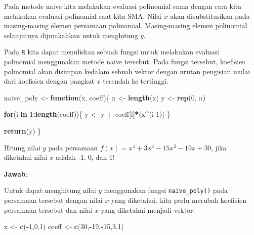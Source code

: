 \documentclass[]{book}
\newenvironment{Shaded}{\begin{snugshade}}{\end{snugshade}}
\newcommand{\ControlFlowTok}[1]{\textcolor[rgb]{0.13,0.29,0.53}{\textbf{#1}}}
\newcommand{\DecValTok}[1]{\textcolor[rgb]{0.00,0.00,0.81}{#1}}
\newcommand{\KeywordTok}[1]{\textcolor[rgb]{0.13,0.29,0.53}{\textbf{#1}}}
\newcommand{\NormalTok}[1]{#1}
\newcommand{\OperatorTok}[1]{\textcolor[rgb]{0.81,0.36,0.00}{\textbf{#1}}}
\newcommand{\StringTok}[1]{\textcolor[rgb]{0.31,0.60,0.02}{#1}}
\theoremstyle{definition}
\theoremstyle{definition}
\theoremstyle{definition}
\theoremstyle{remark}
\let\BeginKnitrBlock\begin \let\EndKnitrBlock\end
\begin{document}
Pada metode naive kita melakukan evaluasi polinomial sama dengan cara kita melakukan evaluasi polinomial saat kita SMA. Nilai \(x\) akan disubstitusikan pada masing-masing elemen persamaan polinomial. Masing-masing elemen polinomial selanjutnya dijumkahkan untuk menghitung \(y\).

Pada \texttt{R} kita dapat menuliskan sebuah fungsi untuk melakukan evaluasi polinomial menggunakan metode naive tersebut. Pada fungsi tersebut, koefisien polinomial akan disimpan kedalam sebuah vektor dengan urutan pengisian mulai dari koefisien dengan pangkat \(x\) terendah ke tertinggi.

\begin{Shaded}
\begin{Highlighting}[]
\NormalTok{naive_poly <-}\StringTok{ }\ControlFlowTok{function}\NormalTok{(x, coeff)\{}
\NormalTok{  n <-}\StringTok{ }\KeywordTok{length}\NormalTok{(x)}
\NormalTok{  y <-}\StringTok{ }\KeywordTok{rep}\NormalTok{(}\DecValTok{0}\NormalTok{, n)}
  
  \ControlFlowTok{for}\NormalTok{(i }\ControlFlowTok{in} \DecValTok{1}\OperatorTok{:}\KeywordTok{length}\NormalTok{(coeff))\{}
\NormalTok{    y <-}\StringTok{ }\NormalTok{y }\OperatorTok{+}\StringTok{ }\NormalTok{coeff[i]}\OperatorTok{*}\NormalTok{(x}\OperatorTok{^}\NormalTok{(i}\DecValTok{-1}\NormalTok{))}
\NormalTok{  \}}
  
  \KeywordTok{return}\NormalTok{(y)}
\NormalTok{\}}
\end{Highlighting}
\end{Shaded}

\BeginKnitrBlock{example}
\protect\hypertarget{exm:polievalexmp}{}{\label{exm:polievalexmp} }Hitung nilai \(y\) pada persamaan \(f\left(x\right)=x^4+3x^3-15x^2-19x+30\), jika diketahui nilai \(x\) adalah -1, 0, dan 1!
\EndKnitrBlock{example}

\textbf{Jawab}:

Untuk dapat menghitung nilai \(y\) menggunakan fungsi \texttt{naive\_poly()} pada persamaan tersebut dengan nilai \(x\) yang diketahui, kita perlu merubah koefisien persamaan tersebut dan nilai \(x\) yang diketahui menjadi vektor:

\begin{Shaded}
\begin{Highlighting}[]
\NormalTok{x <-}\StringTok{ }\KeywordTok{c}\NormalTok{(}\OperatorTok{-}\DecValTok{1}\NormalTok{,}\DecValTok{0}\NormalTok{,}\DecValTok{1}\NormalTok{)}
\NormalTok{coeff <-}\StringTok{ }\KeywordTok{c}\NormalTok{(}\DecValTok{30}\NormalTok{,}\OperatorTok{-}\DecValTok{19}\NormalTok{,}\OperatorTok{-}\DecValTok{15}\NormalTok{,}\DecValTok{3}\NormalTok{,}\DecValTok{1}\NormalTok{)}
\end{Highlighting}
\end{Shaded}
\end{document}
